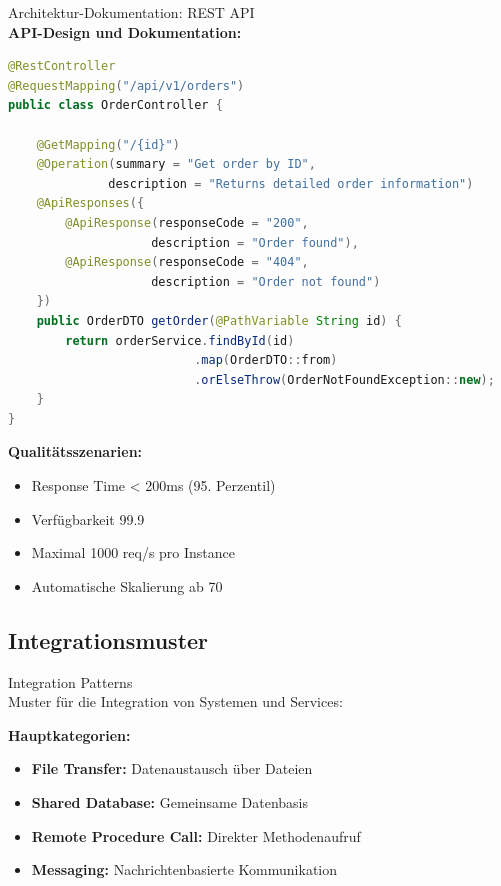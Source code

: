 \begin{example2}{Architektur-Dokumentation: REST API}\\
\textbf{API-Design und Dokumentation:}

\begin{lstlisting}[language=Java, style=basesmol]
@RestController
@RequestMapping("/api/v1/orders")
public class OrderController {
    
    @GetMapping("/{id}")
    @Operation(summary = "Get order by ID",
              description = "Returns detailed order information")
    @ApiResponses({
        @ApiResponse(responseCode = "200", 
                    description = "Order found"),
        @ApiResponse(responseCode = "404", 
                    description = "Order not found")
    })
    public OrderDTO getOrder(@PathVariable String id) {
        return orderService.findById(id)
                          .map(OrderDTO::from)
                          .orElseThrow(OrderNotFoundException::new);
    }
}
\end{lstlisting}

\textbf{Qualitätsszenarien:}
\begin{itemize}
    \item Response Time < 200ms (95. Perzentil)
    \item Verfügbarkeit 99.9%
    \item Maximal 1000 req/s pro Instance
    \item Automatische Skalierung ab 70%
\end{itemize}
\end{example2}

\subsection{Integrationsmuster}

\begin{concept}{Integration Patterns}\\
Muster für die Integration von Systemen und Services:

\textbf{Hauptkategorien:}
\begin{itemize}
    \item \textbf{File Transfer:} Datenaustausch über Dateien
    \item \textbf{Shared Database:} Gemeinsame Datenbasis
    \item \textbf{Remote Procedure Call:} Direkter Methodenaufruf
    \item \textbf{Messaging:} Nachrichtenbasierte Kommunikation
\end{itemize}
\end{concept}

